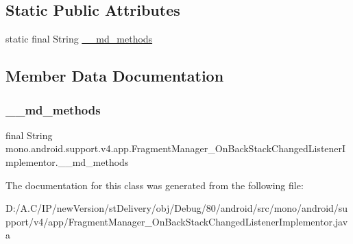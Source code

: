 \subsection*{Static Public Attributes}
\begin{DoxyCompactItemize}
\item 
static final String \hyperlink{classmono_1_1android_1_1support_1_1v4_1_1app_1_1_fragment_manager___on_back_stack_changed_listener_implementor_ae3a9121b1e65698984587cc5620a10b7}{\+\_\+\+\_\+md\+\_\+methods}
\end{DoxyCompactItemize}


\subsection{Member Data Documentation}
\mbox{\label{classmono_1_1android_1_1support_1_1v4_1_1app_1_1_fragment_manager___on_back_stack_changed_listener_implementor_ae3a9121b1e65698984587cc5620a10b7}} 
\subsubsection{\texorpdfstring{\+\_\+\+\_\+md\+\_\+methods}{\_\_md\_methods}}
{\footnotesize\ttfamily final String mono.\+android.\+support.\+v4.\+app.\+Fragment\+Manager\+\_\+\+On\+Back\+Stack\+Changed\+Listener\+Implementor.\+\_\+\+\_\+md\+\_\+methods\hspace{0.3cm}{\ttfamily [static]}}



The documentation for this class was generated from the following file\+:\begin{DoxyCompactItemize}
\item 
D\+:/\+A.\+C/\+I\+P/new\+Version/st\+Delivery/obj/\+Debug/80/android/src/mono/android/support/v4/app/Fragment\+Manager\+\_\+\+On\+Back\+Stack\+Changed\+Listener\+Implementor.\+java\end{DoxyCompactItemize}
